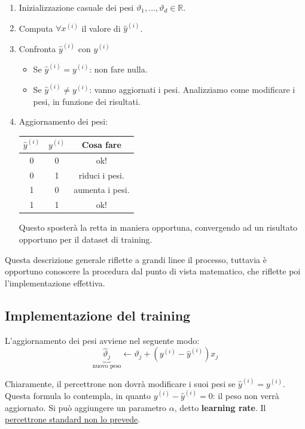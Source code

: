 \begin{enumerate}
	\item Inizializzazione casuale dei pesi $\vartheta_1, \dots, \vartheta_d \in \mathbb{R}$.
	\item Computa $\forall x^{(i)}$ il valore di $\hat{y}^{(i)}$.
	\item Confronta $\hat{y}^{(i)}$ con $y^{(i)}$
	\begin{itemize}
		\item Se  $\hat{y}^{(i)} = y^{(i)}$: non fare nulla.
		\item Se $\hat{y}^{(i)} \neq y^{(i)}$: vanno aggiornati i pesi. Analizziamo come modificare i pesi, in funzione dei risultati.
	\end{itemize}
	
	\item Aggiornamento dei pesi:
	
	\begin{center}
		\begin{tabular}{|c|c|c|}
			\hline
			$\hat{y}^{(i)}$ & $y^{(i)}$ & Cosa fare\\
			\hline
			0 & 0 & ok!\\
			0 & 1 & riduci i pesi.\\
			1 & 0 & aumenta i pesi.\\
			1 & 1 & ok!\\
			\hline
		\end{tabular}
	\end{center}
	
	Questo sposterà la retta in maniera opportuna, convergendo ad un risultato opportuno per il dataset di training.
\end{enumerate}

Questa descrizione generale riflette a grandi linee il processo, tuttavia è opportuno conoscere la procedura dal punto di vista matematico, che riflette poi l'implementazione effettiva.

\subsection{Implementazione del training}
L'aggiornamento dei pesi avviene nel seguente modo:
$$
\underbrace{\hat{\vartheta}_j}_\text{nuovo peso}\leftarrow \vartheta_j + ( y^{(i)} -\hat{y}^{(i)})x_j
$$

Chiaramente, il percettrone non dovrà modificare i suoi pesi se $\hat{y}^{(i)} = y^{(i)}$. Questa formula lo contempla, in quanto $y^{(i)} - \hat{y}^{(i)} = 0$: il peso non verrà aggiornato. 
Si può aggiungere un parametro $\alpha$, detto \textbf{learning rate}. Il \underline{percettrone standard non lo prevede}.


